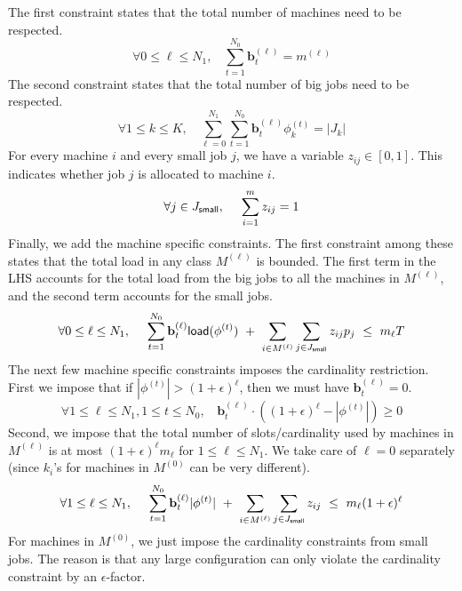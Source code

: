 \documentclass{article}[11pt]
\def\pv{\mathbf{b}}
\newcommand{\dem}{\mathsf{load}}
\begin{document}
\noindent
The first constraint states that the total number of machines need to be respected.
\begin{equation}\label{eq:milp1}
\forall 0\leq \ell \leq N_1, ~~~~ \sum_{t=1}^{N_0} \pv^{(\ell)}_t = m^{(\ell)}
\end{equation}
The second constraint states that the total number of big jobs need to be respected.
\begin{equation}\label{eq:milp2}
\forall 1\leq k \leq K, ~~~~ \sum_{\ell = 0}^{N_1} \sum_{t=1}^{N_0} \pv^{(\ell)}_t \phi^{(t)}_k = |J_k|
\end{equation}
For every machine $i$ and every small job $j$, we have a variable $z_{ij} \in [0,1]$. This indicates whether job $j$ is allocated to machine $i$.
\begin{equation}\label{eq:milp3}
\forall j\in J_{\mathsf{small}}, ~~~~ \sum_{i=1}^m z_{ij} = 1
\end{equation}
Finally, we add the machine specific constraints. The first constraint among these states that the total load in any class $M^{(\ell)}$ is bounded.
The first term in the LHS accounts for the total load from the big jobs to all the machines in $M^{(\ell)}$, and the second term accounts for the small jobs.
\begin{equation}\label{eq:milp4}
\forall 0\leq \ell \leq N_1, ~~~~ \sum_{t=1}^{N_0} \pv^{(\ell)}_t \dem(\phi^{(t)}) ~ + ~ \sum_{i\in M^{(\ell)}} \sum_{j\in J_\sm} z_{ij}p_j ~\leq~ m_\ell T
\end{equation}
The next few machine specific constraints imposes the cardinality restriction. 
First we impose that if $|\phi^{(t)}| > (1+\epsilon)^\ell$, then we must have $\pv^{(\ell)}_t = 0$.
\begin{equation}\label{eq:milp5}
\forall 1\leq \ell \leq N_1, 1\leq t\leq N_0, ~~~~ \pv^{(\ell)}_t\cdot\left((1+\epsilon)^\ell - |\phi^{(t)}| \right) \geq 0
\end{equation}
Second, we impose that the total number of slots/cardinality used by machines in $M^{(\ell)}$ is at most $(1+\epsilon)^\ell m_\ell$ for $1\le \ell \le N_1$.
We take care of  $\ell = 0$ separately (since $k_i$'s for machines in $M^{(0)}$ can be very different).
\begin{equation}\label{eq:milp6}
\forall 1\leq \ell \leq N_1, ~~~~ \sum_{t=1}^{N_0} \pv^{(\ell)}_t |\phi^{(t)}|~ + ~ \sum_{i\in M^{(\ell)}} \sum_{j\in J_\sm} z_{ij} ~\leq~ m_\ell (1+\epsilon)^\ell
\end{equation}
For machines in $M^{(0)}$, we just impose the cardinality constraints from small jobs. The reason is that any large configuration can only violate the cardinality constraint by an $\epsilon$-factor.
\end{document}
